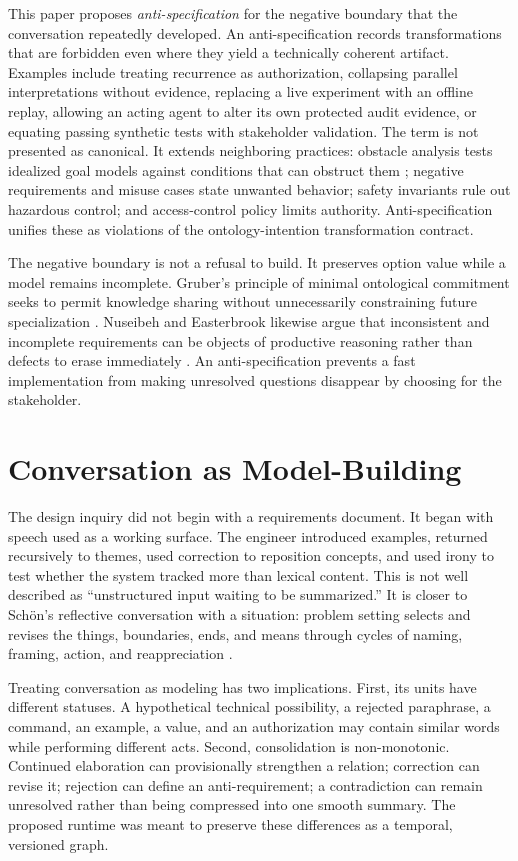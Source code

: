 \documentclass[10pt,a4paper]{article}
\begin{document}
This paper proposes \emph{anti-specification} for the negative boundary that the conversation repeatedly developed. An anti-specification records transformations that are forbidden even where they yield a technically coherent artifact. Examples include treating recurrence as authorization, collapsing parallel interpretations without evidence, replacing a live experiment with an offline replay, allowing an acting agent to alter its own protected audit evidence, or equating passing synthetic tests with stakeholder validation. The term is not presented as canonical. It extends neighboring practices: obstacle analysis tests idealized goal models against conditions that can obstruct them \cite{vanlamsweerde2000}; negative requirements and misuse cases state unwanted behavior; safety invariants rule out hazardous control; and access-control policy limits authority. Anti-specification unifies these as violations of the ontology-intention transformation contract.

The negative boundary is not a refusal to build. It preserves option value while a model remains incomplete. Gruber's principle of minimal ontological commitment seeks to permit knowledge sharing without unnecessarily constraining future specialization \cite{gruber1995}. Nuseibeh and Easterbrook likewise argue that inconsistent and incomplete requirements can be objects of productive reasoning rather than defects to erase immediately \cite{nuseibeh2000}. An anti-specification prevents a fast implementation from making unresolved questions disappear by choosing for the stakeholder.

\section{Conversation as Model-Building}

The design inquiry did not begin with a requirements document. It began with speech used as a working surface. The engineer introduced examples, returned recursively to themes, used correction to reposition concepts, and used irony to test whether the system tracked more than lexical content. This is not well described as ``unstructured input waiting to be summarized.'' It is closer to Sch\"on's reflective conversation with a situation: problem setting selects and revises the things, boundaries, ends, and means through cycles of naming, framing, action, and reappreciation \cite{schon1983,schon1992}.

Treating conversation as modeling has two implications. First, its units have different statuses. A hypothetical technical possibility, a rejected paraphrase, a command, an example, a value, and an authorization may contain similar words while performing different acts. Second, consolidation is non-monotonic. Continued elaboration can provisionally strengthen a relation; correction can revise it; rejection can define an anti-requirement; a contradiction can remain unresolved rather than being compressed into one smooth summary. The proposed runtime was meant to preserve these differences as a temporal, versioned graph.
\end{document}
